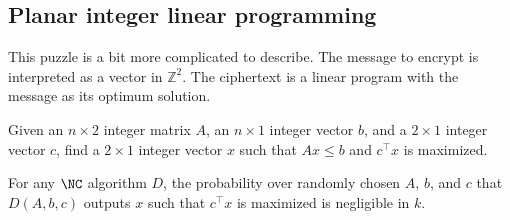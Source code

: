 \documentclass{article}
\begin{document}
\subsection{Planar integer linear programming}

This puzzle is a bit more complicated to describe.
The message to encrypt is interpreted as a vector in $\mathbb{Z}^2$.
The ciphertext is a linear program with the message as its optimum solution.

\begin{definition}
  Given an $n \times 2$ integer matrix $A$, an $n \times 1$ integer vector $b$, and a $2 \times 1$ integer vector $c$, find a $2 \times 1$ integer vector $x$ such that $Ax \leq b$ and $c^\intercal x$ is maximized.
\end{definition}

\begin{assumption}
  For any $\NC$ algorithm $D$, the probability over randomly chosen $A$, $b$, and $c$ that $D(A, b, c)$ outputs $x$ such that $c^\intercal x$ is maximized is negligible in $k$.
\end{assumption}
\end{document}
